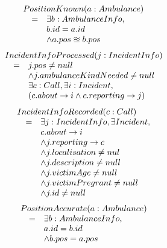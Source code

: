 \begin{equation*}
\begin{array}{rcl}
\multicolumn{3}{l}{PositionKnown(a:Ambulance)} \\ 
& = & \exists b:AmbulanceInfo, \\
&   & b.id = a.id \\
&   & \wedge a.pos \approxeq b.pos \\
\end{array}
\end{equation*}
\begin{equation*}
\begin{array}{rcl}
\multicolumn{3}{l}{IncidentInfoProcessed(j:IncidentInfo)} \\ 
& = & j.pos \neq null \\
&   & \wedge j.ambulanceKindNeeded \neq null \\
&   & \exists c:Call, \exists i:Incident, \\
&   & (c.about \rightarrow i \wedge c.reporting \rightarrow j) \\
\end{array}
\end{equation*}
\begin{equation*}
\begin{array}{rcl}
\multicolumn{3}{l}{IncidentInfoRecorded(c:Call)} \\ 
& = & \exists j:IncidentInfo, \exists Incident, \\
&   & c.about \rightarrow i \\
&   & \wedge j.reporting \rightarrow c \\
&   & \wedge j.localisation \neq nul \\
&   & \wedge j.description \neq null \\
&   & \wedge j.victimAge \neq null \\
&   & \wedge j.victimPregrant \neq null \\
&   & \wedge j.id \neq null \\
\end{array}
\end{equation*}
\begin{equation*}
\begin{array}{rcl}
\multicolumn{3}{l}{PositionAccurate(a:Ambulance)} \\ 
& = & \exists b:AmbulanceInfo, \\
&   & a.id = b.id \\
&   & \wedge b.pos = a.pos \\
\end{array}
\end{equation*}
